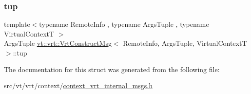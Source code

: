 \mbox{\label{structvt_1_1vrt_1_1_vrt_construct_msg_a5d74ba39e846fba16e6cc83c33c21fe2}} 
\subsubsection{\texorpdfstring{tup}{tup}}
{\footnotesize\ttfamily template$<$typename Remote\+Info , typename Args\+Tuple , typename Virtual\+ContextT $>$ \\
Args\+Tuple \hyperlink{structvt_1_1vrt_1_1_vrt_construct_msg}{vt\+::vrt\+::\+Vrt\+Construct\+Msg}$<$ Remote\+Info, Args\+Tuple, Virtual\+ContextT $>$\+::tup}



The documentation for this struct was generated from the following file\+:\begin{DoxyCompactItemize}
\item 
src/vt/vrt/context/\hyperlink{context__vrt__internal__msgs_8h}{context\+\_\+vrt\+\_\+internal\+\_\+msgs.\+h}\end{DoxyCompactItemize}
